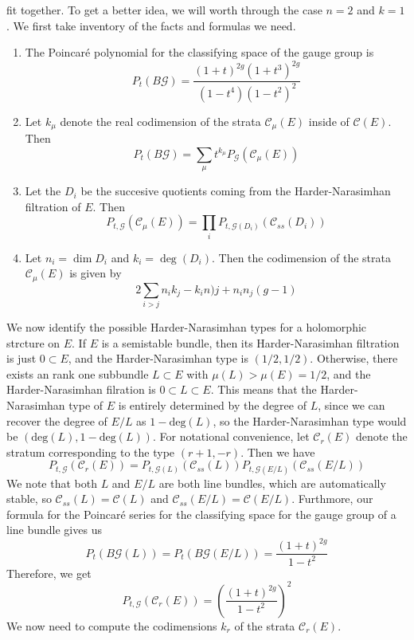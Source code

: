 fit together. To get a better idea, we will worth through the case
$n = 2$ and $k = 1$. We first take inventory of the facts and formulas we need.
\begin{enumerate}
  \item The Poincar\'e polynomial for the classifying space of the gauge group is
  \[
  P_t(B\mathscr{G}) = \frac{(1+t)^{2g}(1+t^3)^{2g}}{(1-t^4)(1-t^2)^2}
  \]
  \item  Let $k_\mu$ denote the real codimension of the strata $\mathscr{C}_\mu(E)$
  inside of $\mathscr{C}(E)$. Then
  \[
  P_t(B\mathscr{G}) = \sum_{\mu}t^{k_\mu}P_{\mathscr{G}}(\mathscr{C}_\mu(E))
  \]
  \item Let the $D_i$ be the succesive quotients coming from the Harder-Narasimhan
  filtration of $E$. Then
  \[
  P_{t,\mathscr{G}}(\mathscr{C}_\mu(E))
  = \prod_iP_{t,\mathscr{G}(D_i)}(\mathscr{C}_{ss}(D_i))
  \]
  \item Let $n_i = \dim D_i$ and $k_i = \deg(D_i)$. Then the codimension
  of the strata $\mathscr{C}_\mu(E)$ is given by
  \[
  2\sum_{i > j}n_ik_j-k_in)j + n_in_j(g-1)
  \]
\end{enumerate}
%
We now identify the possible Harder-Narasimhan types for a holomorphic strcture
on $E$. If $E$ is a semistable bundle, then its Harder-Narasimhan filtration
is just $0 \subset E$, and the Harder-Narasimhan type is $(1/2,1/2)$. Otherwise,
there exists an rank one subbundle $L \subset E$ with $\mu(L) > \mu(E) = 1/2$, and
the Harder-Narasimhan filration is $0 \subset L \subset E$. This means that the
Harder-Narasimhan type of $E$ is entirely determined by the degree of $L$, since
we can recover the degree of $E/L$ as $1 - \mathrm{deg}(L)$, so the
Harder-Narasimhan type would be $(\mathrm{deg}(L), 1- \mathrm{deg}(L))$. For
notational convenience, let $\mathscr{C}_r(E)$ denote the stratum corresponding
to the type $(r+1,-r)$. Then we have
\[
P_{t,\mathscr{G}}(\mathscr{C}_r(E))
= P_{t,\mathscr{G}(L)}(\mathscr{C}_{ss}(L)) P_{t,\mathscr{G}(E/L)}(\mathscr{C}_{ss}(E/L))
\]
We note that both $L$ and $E/L$ are both line bundles, which are automatically stable,
so $\mathscr{C}_{ss}(L) = \mathscr{C}(L)$ and $\mathscr{C}_{ss}(E/L) = \mathscr{C}(E/L)$.
Furthmore, our formula for the Poincar\'e series for the classifying space
for the gauge group of a line bundle gives us
\[
P_t(B\mathscr{G}(L)) = P_t(B\mathscr{G}(E/L)) = \frac{(1+t)^{2g}}{1-t^2}
\]
Therefore, we get
\[
P_{t, \mathscr{G}}(\mathscr{C}_r(E)) = \left(\frac{(1+t)^{2g}}{1-t^2}\right)^2
\]
We now need to compute the codimensions $k_r$ of the strata $\mathscr{C}_r(E)$.
